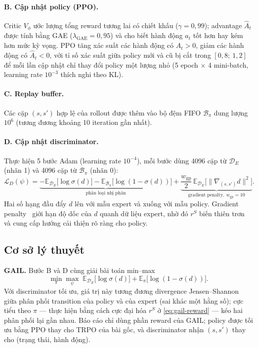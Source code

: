 \documentclass[11pt,a4paper]{article}
\newcommand{\E}{\mathbb{E}}
\begin{document}
\paragraph{B. Cập nhật policy (PPO).} Critic $V_\phi$ ước lượng tổng reward tương lai có
chiết khấu ($\gamma = 0{,}99$); advantage $\hat A_t$ được tính bằng GAE ($\lambda_\text{GAE}
= 0{,}95$) và cho biết hành động $a_t$ tốt hơn hay kém hơn mức kỳ vọng. PPO tăng xác suất
các hành động có $\hat A_t > 0$, giảm các hành động có $\hat A_t < 0$, với tỉ số xác suất
giữa policy mới và cũ bị cắt trong $[0{,}8;\ 1{,}2]$ để mỗi lần cập nhật chỉ thay đổi policy
một lượng nhỏ (5 epoch $\times$ 4 mini-batch, learning rate $10^{-3}$ thích nghi theo KL).

\paragraph{C. Replay buffer.} Các cặp $(s, s')$ hợp lệ của rollout được thêm vào bộ đệm FIFO
$\mathcal{B}_\pi$ dung lượng $10^6$ (tương đương khoảng 10 iteration gần nhất).

\paragraph{D. Cập nhật discriminator.} Thực hiện 5 bước Adam (learning rate $10^{-4}$), mỗi
bước dùng 4096 cặp từ $\mathcal{D}_E$ (nhãn 1) và 4096 cặp từ $\mathcal{B}_\pi$ (nhãn 0):
\begin{equation}
  \mathcal{L}_D(\psi) =
  \underbrace{-\E_{\mathcal{D}_E}\big[\log \sigma(d)\big]
  - \E_{\mathcal{B}_\pi}\big[\log(1 - \sigma(d))\big]}_{\text{phân loại nhị phân}}
  + \underbrace{\frac{w_\text{gp}}{2}\,\E_{\mathcal{D}_E}\big[\|\nabla_{(s,s')} d\|^2\big]}_{\text{gradient penalty},\ w_\text{gp} = 10}.
  \label{eq:disc}
\end{equation}
Hai số hạng đầu đẩy $d$ lên với mẫu expert và xuống với mẫu policy. Gradient
penalty~\cite{mescheder2018gp} giới hạn độ dốc của $d$ quanh dữ liệu expert, nhờ đó
$r^S$ biến thiên trơn và cung cấp hướng cải thiện rõ ràng cho policy.

\subsection{Cơ sở lý thuyết}
\textbf{GAIL.} Bước B và D cùng giải bài toán min--max~\cite{ho2016gail}
\begin{equation}
  \min_\pi \max_\psi \;
  \E_{\mathcal{D}_E}\big[\log \sigma(d)\big] + \E_{\pi}\big[\log(1 - \sigma(d))\big].
  \label{eq:gail-game}
\end{equation}
Với discriminator tối ưu, giá trị này tương đương divergence Jensen--Shannon giữa phân
phối transition của policy và của expert (sai khác một hằng số); cực tiểu theo $\pi$ ---
thực hiện bằng cách cực đại hóa $r^S$ ở \eqref{eq:gail-reward} --- kéo hai phân phối lại
gần nhau. Báo cáo chỉ dùng phần reward của GAIL; policy được tối ưu bằng PPO thay cho
TRPO của bài gốc, và discriminator nhận $(s, s')$ thay cho (trạng thái, hành động).
\end{document}
